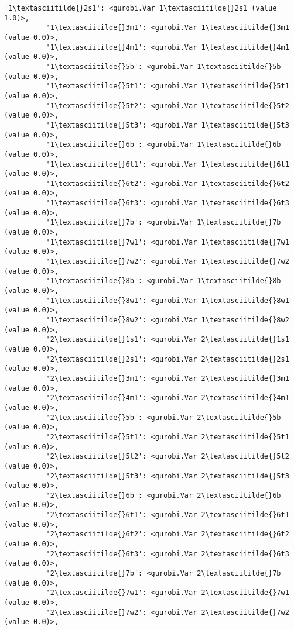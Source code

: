 \documentclass[11pt]{article}
\begin{document}
\begin{Verbatim}[commandchars=\\\{\}]
          '1\textasciitilde{}2s1': <gurobi.Var 1\textasciitilde{}2s1 (value 1.0)>,
          '1\textasciitilde{}3m1': <gurobi.Var 1\textasciitilde{}3m1 (value 0.0)>,
          '1\textasciitilde{}4m1': <gurobi.Var 1\textasciitilde{}4m1 (value 0.0)>,
          '1\textasciitilde{}5b': <gurobi.Var 1\textasciitilde{}5b (value 0.0)>,
          '1\textasciitilde{}5t1': <gurobi.Var 1\textasciitilde{}5t1 (value 0.0)>,
          '1\textasciitilde{}5t2': <gurobi.Var 1\textasciitilde{}5t2 (value 0.0)>,
          '1\textasciitilde{}5t3': <gurobi.Var 1\textasciitilde{}5t3 (value 0.0)>,
          '1\textasciitilde{}6b': <gurobi.Var 1\textasciitilde{}6b (value 0.0)>,
          '1\textasciitilde{}6t1': <gurobi.Var 1\textasciitilde{}6t1 (value 0.0)>,
          '1\textasciitilde{}6t2': <gurobi.Var 1\textasciitilde{}6t2 (value 0.0)>,
          '1\textasciitilde{}6t3': <gurobi.Var 1\textasciitilde{}6t3 (value 0.0)>,
          '1\textasciitilde{}7b': <gurobi.Var 1\textasciitilde{}7b (value 0.0)>,
          '1\textasciitilde{}7w1': <gurobi.Var 1\textasciitilde{}7w1 (value 0.0)>,
          '1\textasciitilde{}7w2': <gurobi.Var 1\textasciitilde{}7w2 (value 0.0)>,
          '1\textasciitilde{}8b': <gurobi.Var 1\textasciitilde{}8b (value 0.0)>,
          '1\textasciitilde{}8w1': <gurobi.Var 1\textasciitilde{}8w1 (value 0.0)>,
          '1\textasciitilde{}8w2': <gurobi.Var 1\textasciitilde{}8w2 (value 0.0)>,
          '2\textasciitilde{}1s1': <gurobi.Var 2\textasciitilde{}1s1 (value 0.0)>,
          '2\textasciitilde{}2s1': <gurobi.Var 2\textasciitilde{}2s1 (value 0.0)>,
          '2\textasciitilde{}3m1': <gurobi.Var 2\textasciitilde{}3m1 (value 0.0)>,
          '2\textasciitilde{}4m1': <gurobi.Var 2\textasciitilde{}4m1 (value 0.0)>,
          '2\textasciitilde{}5b': <gurobi.Var 2\textasciitilde{}5b (value 0.0)>,
          '2\textasciitilde{}5t1': <gurobi.Var 2\textasciitilde{}5t1 (value 0.0)>,
          '2\textasciitilde{}5t2': <gurobi.Var 2\textasciitilde{}5t2 (value 0.0)>,
          '2\textasciitilde{}5t3': <gurobi.Var 2\textasciitilde{}5t3 (value 0.0)>,
          '2\textasciitilde{}6b': <gurobi.Var 2\textasciitilde{}6b (value 0.0)>,
          '2\textasciitilde{}6t1': <gurobi.Var 2\textasciitilde{}6t1 (value 0.0)>,
          '2\textasciitilde{}6t2': <gurobi.Var 2\textasciitilde{}6t2 (value 0.0)>,
          '2\textasciitilde{}6t3': <gurobi.Var 2\textasciitilde{}6t3 (value 0.0)>,
          '2\textasciitilde{}7b': <gurobi.Var 2\textasciitilde{}7b (value 0.0)>,
          '2\textasciitilde{}7w1': <gurobi.Var 2\textasciitilde{}7w1 (value 0.0)>,
          '2\textasciitilde{}7w2': <gurobi.Var 2\textasciitilde{}7w2 (value 0.0)>,

\end{Verbatim}
\end{document}
